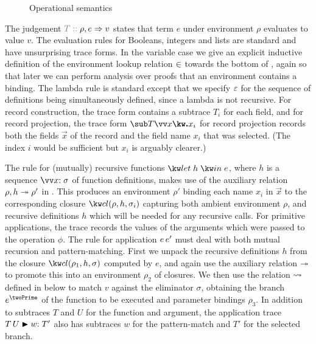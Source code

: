 \begin{figure}
   \vspace{1mm}
   
   
   \caption{Operational semantics}
   \label{fig:core-language:semantics}
\end{figure}



The judgement $\explVal{T}{\rho, e \evalR v}$ states that term $e$ under environment $\rho$ evaluates to value $v$.  The evaluation rules for Booleans, integers and lists are standard and have unsurprising trace forms. In the variable case we give an explicit inductive definition of the environment lookup relation $\in$ towards the bottom of , again so that later we can perform analysis over proofs that an environment contains a binding. The lambda rule is standard except that we specify $\varepsilon$ for the sequence of definitions being simultaneously defined, since a lambda is not recursive. For record construction, the trace form contains a subtrace $T_i$ for each field, and for record projection, the trace form $\trRecProj{T}{\vec{x}}{x_i}$ for record projection records both the fields $\vec{x}$ of the record and the field name $x_i$ that was selected. (The index $i$ would be sufficient but $x_i$ is arguably clearer.)

The rule for (mutually) recursive functions $\exLetRecMutual{h}{e}$, where $h$ is a sequence $\vec{\bind{x}{\sigma}}$ of function definitions, makes use of the auxiliary relation $\rho, h \twoheadrightarrow \rho'$ in . This produces an environment $\rho'$ binding each name $x_i$ in $\vec{x}$ to the corresponding closure $\exClosure{\rho}{h}{\sigma_i}$ capturing both ambient environment $\rho$, and recursive definitions $h$ which will be needed for any recursive calls. For primitive applications, the trace records the values of the arguments which were passed to the operation $\phi$. The rule for application ${e}\,{e'}$ must deal with both mutual recursion and pattern-matching. First we unpack the recursive definitions $h$ from the closure $\exClosure{\rho_1}{h}{\sigma}$ computed by $e$, and again use the auxiliary relation $\twoheadrightarrow$ to promote this into an environment $\rho_2$ of closures. We then use the relation $\rightsquigarrow$ defined in  below to match $v$ against the eliminator $\sigma$, obtaining the branch $e^\twoPrime$ of the function to be executed and parameter bindings $\rho_3$. In addition to subtraces $T$ and $U$ for the function and argument, the application trace ${T}\,{U} \mathrel{\blacktriangleright} {w{:}\;T'}$ also has subtraces $w$ for the pattern-match and $T'$ for the selected branch.

